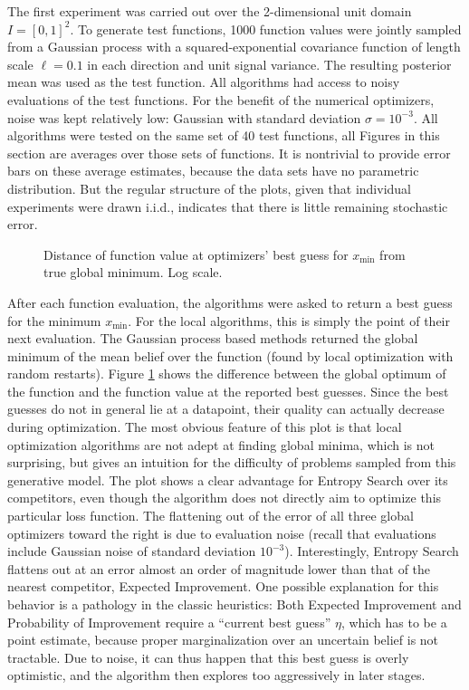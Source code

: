 \documentclass[twoside,11pt]{article}
\newcommand{\xmin}{x_{\min}}
\newcommand{\inputTikZ}[1]{%
 }
\newcommand{\inputTikZ}[1]{%
   \beginpgfgraphicnamed{#1-external}%
   \endpgfgraphicnamed%
 }
\begin{document}
The first experiment was carried out over the 2-dimensional unit
domain $I=[0,1]^2$. To generate test functions, 1000 function values
were jointly sampled from a Gaussian process with a squared-exponential
covariance function of length scale $\ell=0.1$ in each direction and
unit signal variance. The resulting posterior mean was used as the
test function. All algorithms had access to noisy evaluations of the
test functions. For the benefit of the numerical optimizers, noise was
kept relatively low: Gaussian with standard deviation
$\sigma=10^{-3}$. All algorithms were tested on the same set of 40
test functions, all Figures in this section are averages over those
sets of functions. It is nontrivial to provide error bars on these
average estimates, because the data sets have no parametric
distribution. But the regular structure of the plots, given that
individual experiments were drawn i.i.d., indicates that there is
little remaining stochastic error.

\begin{figure}
  \centering
  \inputTikZ{figures/fdist_wB_2D_SE}
  \caption{Distance of function value at optimizers' best guess for
    $\xmin$ from true global minimum. Log scale.}
  \label{fig:fval_onmodel}
\end{figure}

After each function evaluation, the algorithms were asked to return a
best guess for the minimum $\xmin$. For the local algorithms, this is
simply the point of their next evaluation. The Gaussian process based
methods returned the global minimum of the mean belief over the
function (found by local optimization with random restarts). Figure
\ref{fig:fval_onmodel} shows the difference between the global optimum
of the function and the function value at the reported best
guesses. Since the best guesses do not in general lie at a datapoint,
their quality can actually decrease during optimization. The most obvious
feature of this plot is that local optimization algorithms are not
adept at finding global minima, which is not surprising, but gives an
intuition for the difficulty of problems sampled from this generative
model. The plot shows a clear advantage for Entropy Search over its
competitors, even though the algorithm does not directly aim to
optimize this particular loss function. The flattening out of the
error of all three global optimizers toward the right is due to
evaluation noise (recall that evaluations include Gaussian noise of
standard deviation $10^{-3}$). Interestingly, Entropy Search flattens
out at an error almost an order of magnitude lower than that of the
nearest competitor, Expected Improvement. One possible explanation for
this behavior is a pathology in the classic heuristics: Both Expected
Improvement and Probability of Improvement require a ``current best
guess'' $\eta$, which has to be a point estimate, because proper
marginalization over an uncertain belief is not tractable. Due to
noise, it can thus happen that this best guess is overly optimistic,
and the algorithm then explores too aggressively in later stages.
\end{document}
